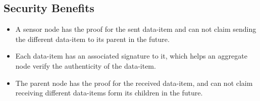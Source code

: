 	\subsection{Security Benefits}
		\begin{itemize}
			\item A sensor node has the proof for the sent data-item and can not claim sending the different data-item to its parent in the future.
			\item Each data-item has an associated signature to it, which helps an aggregate node verify the authenticity of the data-item.
			\item The parent node has the proof for the received data-item, and can not claim receiving different data-items form its children in the future.
		\end{itemize}

